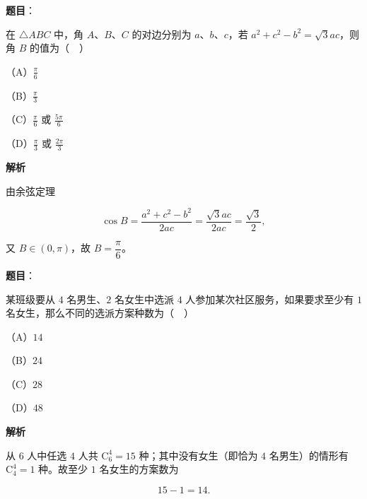 \begin{answer}

\textbf{题目}：

在 $\triangle ABC$ 中，角 $A$、$B$、$C$ 的对边分别为 $a$、$b$、$c$，若 $a^2+c^2-b^2=\sqrt3ac$，则角 $B$ 的值为（　）

（A）$\frac{\pi}{6}$

（B）$\frac{\pi}{3}$

（C）$\frac{\pi}{6}$ 或 $\frac{5\pi}{6}$

（D）$\frac{\pi}{3}$ 或 $\frac{2\pi}{3}$

\textbf{解析}

由余弦定理

\nopagebreak[4]
\[\cos B=\frac{a^2+c^2-b^2}{2ac}=\frac{\sqrt3ac}{2ac}=\frac{\sqrt3}2,\]

又 $B\in(0,\pi)$，故 $B=\dfrac{\pi}6$。


\end{answer}
\begin{answer}

\textbf{题目}：

某班级要从 $4$ 名男生、$2$ 名女生中选派 $4$ 人参加某次社区服务，如果要求至少有 $1$ 名女生，那么不同的选派方案种数为（　）

（A）$14$

（B）$24$

（C）$28$

（D）$48$

\textbf{解析}

从 $6$ 人中任选 $4$ 人共 $\mathrm C_6^4=15$ 种；其中没有女生（即恰为 $4$ 名男生）的情形有 $\mathrm C_4^4=1$ 种。故至少 $1$ 名女生的方案数为

\nopagebreak[4]
\[15-1=14.\]


\end{answer}
